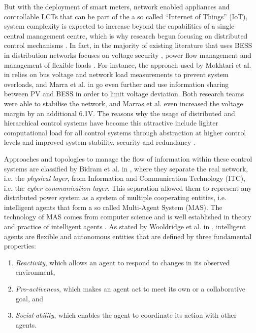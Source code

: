 
But with the deployment of smart meters, network enabled appliances and controllable LCTs that can be part of the a so called ``Internet of Things'' (IoT), system complexity is expected to increase beyond the capabilities of a single central management centre, which is why research begun focusing on distributed control mechanisms \cite{Vovos2007, Guerrero2008, Bidram2014, Sugihara2013, Toledo2013, Marra2013, Mokhtari2013, Gill2014, Dolan2012, Atia2016, Bidram2012, Wang2016}.
In fact, in the majority of existing literature that uses BESS in distribution networks focuses on voltage security \cite{Sugihara2013, Toledo2013, Marra2013, Mokhtari2013, Atia2016}, power flow management \cite{Guerrero2008, Wang2016} and management of flexible loads \cite{Gill2014, Dolan2012}.
For instance, the approach used by Mokhtari et al. in \cite{Mokhtari2013} relies on bus voltage and network load measurements to prevent system overloads, and Marra et al. in \cite{Marra2013} go even further and use information sharing between PV and BESS in order to limit voltage deviation.
Both research teams were able to stabilise the network, and Marras et al. even increased the voltage margin by an additional 6.1V.
The reasons why the usage of distributed and hierarchical control systems have become this attractive include lighter computational load for all control systems through abstraction at higher control levels and improved system stability, security and redundancy \cite{Guerrero2013, Guerrero2013a}.

Approaches and topologies to manage the flow of information within these control systems are classified by Bidram et al. in \cite{Bidram2014}, where they separate the real network, i.e. the \textit{physical layer}, from Information and Communication Technology (ITC), i.e. the \textit{cyber communication layer}.
This separation allowed them to represent any distributed power system as a system of multiple cooperating entities, i.e. intelligent agents that form a so called Multi-Agent System (MAS).
The technology of MAS comes from computer science and is well established in theory and practice of intelligent agents \cite{Russell2009}.
As stated by Wooldridge et al. in \cite{Wooldridge1995}, intelligent agents are flexible and autonomous entities that are defined by three fundamental properties:

\begin{enumerate}
	\item \textit{Reactivity}, which allows an agent to respond to changes in its observed environment,
	\item \textit{Pro-activeness}, which makes an agent act to meet its own or a collaborative goal, and
	\item \textit{Social-ability}, which enables the agent to coordinate its action with other agents.
\end{enumerate}

